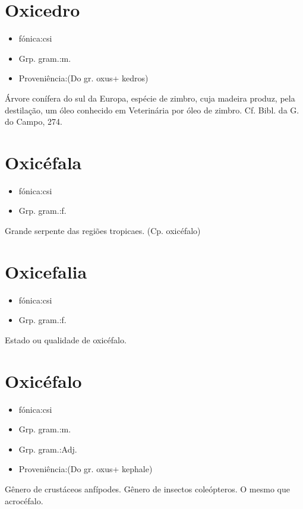\section{Oxicedro}
\begin{itemize}
\item {fónica:csi}
\end{itemize}
\begin{itemize}
\item {Grp. gram.:m.}
\end{itemize}
\begin{itemize}
\item {Proveniência:(Do gr. \textunderscore oxus\textunderscore  + \textunderscore kedros\textunderscore )}
\end{itemize}
Árvore conífera do sul da Europa, espécie de zimbro, cuja madeira produz, pela destilação, um óleo conhecido em Veterinária por \textunderscore óleo de zimbro\textunderscore . Cf. \textunderscore Bibl. da G. do Campo\textunderscore , 274.
\section{Oxicéfala}
\begin{itemize}
\item {fónica:csi}
\end{itemize}
\begin{itemize}
\item {Grp. gram.:f.}
\end{itemize}
Grande serpente das regiões tropicaes.
(Cp. \textunderscore oxicéfalo\textunderscore )
\section{Oxicefalia}
\begin{itemize}
\item {fónica:csi}
\end{itemize}
\begin{itemize}
\item {Grp. gram.:f.}
\end{itemize}
Estado ou qualidade de oxicéfalo.
\section{Oxicéfalo}
\begin{itemize}
\item {fónica:csi}
\end{itemize}
\begin{itemize}
\item {Grp. gram.:m.}
\end{itemize}
\begin{itemize}
\item {Grp. gram.:Adj.}
\end{itemize}
\begin{itemize}
\item {Proveniência:(Do gr. \textunderscore oxus\textunderscore  + \textunderscore kephale\textunderscore )}
\end{itemize}
Gênero de crustáceos anfípodes.
Gênero de insectos coleópteros.
O mesmo que \textunderscore acrocéfalo\textunderscore .
